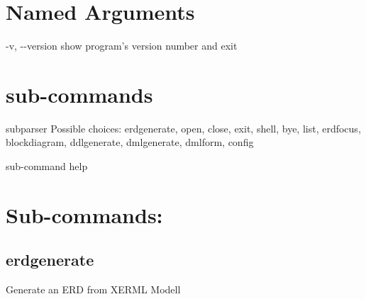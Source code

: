\documentclass[letterpaper,10pt,english,openany,oneside]{sphinxmanual}
\begin{document}
\section{Named Arguments}
\label{\detokenize{cmd_main:Named Arguments}}\label{\detokenize{cmd_main::doc}}\begin{optionlist}{3cm}
\item [-v, -{-}version]  
show program’s version number and exit
\end{optionlist}


\section{sub-commands}
\label{\detokenize{cmd_main:sub-commands}}\begin{optionlist}{3cm}
\item [subparser]  
Possible choices: erdgenerate, open, close, exit, shell, bye, list, erdfocus, blockdiagram, ddlgenerate, dmlgenerate, dmlform, config

sub-command help
\end{optionlist}


\section{Sub-commands:}
\label{\detokenize{cmd_main:Sub-commands:}}

\subsection{erdgenerate}
\label{\detokenize{cmd_main:erdgenerate}}
Generate an ERD from XERML Modell

\begin{sphinxVerbatim}[commandchars=\\\{\}]
  \PYG{p}{[}\PYG{p}{]} \PYG{p}{[} \PYG{p}{]} \PYG{p}{[} \PYG{p}{]} \PYG{p}{[} \PYG{p}{]} \PYG{p}{[} \PYG{p}{]} \PYG{p}{[}\PYG{p}{]}
                  \PYG{p}{[}\PYG{p}{]} \PYG{p}{[}\PYG{p}{]} \PYG{p}{[}\PYG{p}{]} \PYG{p}{[}\PYG{p}{]} \PYG{p}{[}\PYG{p}{]} \PYG{p}{[} \PYG{p}{]} \PYG{p}{[}\PYG{p}{]} \PYG{p}{[}\PYG{p}{]}
\end{sphinxVerbatim}
\end{document}
